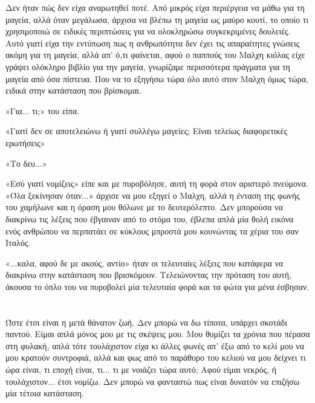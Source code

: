 \documentclass[12pt,twoside, openany]{book}
\begin{document}
Δεν ήταν πώς δεν είχα αναρωτηθεί ποτέ. Από μικρός είχα περιέργεια να μάθω για τη μαγεία, αλλά όταν μεγάλωσα, άρχισα να βλέπω τη μαγεία ως μαύρο κουτί, το οποίο τι χρησιμοποιώ σε ειδικές περιπτώσεις για να ολοκληρώσω συγκεκριμένες δουλειές. Αυτό γιατί είχα την εντύπωση πως η ανθρωπότητα δεν έχει τις απαραίτητες γνώσεις ακόμη για τη μαγεία, αλλά απ’ ό,τι φαίνεται, αφού ο παππούς του Μαλχη κιόλας είχε γράψει ολόκληρο βιβλίο για την μαγεία, γνωρίζαμε περισσότερα πράγματα για τη μαγεία από όσα πίστευα. Που να το εξηγήσω τώρα όλο αυτό στον Μαλχη όμως τώρα, ειδικά στην κατάσταση που βρίσκομαι.

«Για... τι;» του είπα.

«Γιατί δεν σε αποτελειώνω ή γιατί συλλέγω μαγείες; Είναι τελείως διαφορετικές ερωτήσεις»

«Το δευ...»

«Εσύ γιατί νομίζεις» είπε και με πυροβόλησε, αυτή τη φορά στον αριστερό πνεύμονα. «Όλα ξεκίνησαν όταν...» άρχισε να μου εξηγεί ο Μαλχη, αλλά η ένταση της φωνής του χαμήλωνε και η όραση μου θόλωνε με το δευτερόλεπτο. Δεν μπορούσα να διακρίνω τις λέξεις που έβγαιναν από το στόμα του, έβλεπα απλά μία θολή εικόνα ενός ανθρώπου να περπατάει σε κύκλους μπροστά μου κουνώντας τα χέρια του σαν Ιταλός.

«...καλα, αφού δε με ακούς, αντίο» ήταν οι τελευταίες λέξεις που κατάφερα να διακρίνω στην κατάσταση που βρισκόμουν. Τελειώνοντας την πρόταση του αυτή, άκουσα το όπλο του να πυροβολεί μία τελευταία φορά και τα φώτα για μένα έσβησαν.

\chapter{}

Ώστε έτσι είναι η μετά θάνατον ζωή. Δεν μπορώ να δω τίποτα, υπάρχει σκοτάδι παντού. Είμαι απλά μόνος μου με τις σκέψεις μου. Μου θυμίζει τα χρόνια που πέρασα στη φυλακή, απλά τότε τουλάχιστον είχα κι άλλες φωνές απ’ έξω από το κελί μου να μου κρατούν συντροφιά, αλλά και φως από το παράθυρο του κελιού να μου δείχνει τι ώρα είναι, τι εποχή είναι, τι... τι με νοιάζει τώρα αυτό; Αφού είμαι νεκρός, ή τουλάχιστον... έτσι νομίζω. Δεν μπορώ να φανταστώ πως είναι δυνατόν να επιζήσω μία τέτοια κατάσταση.
\end{document}
